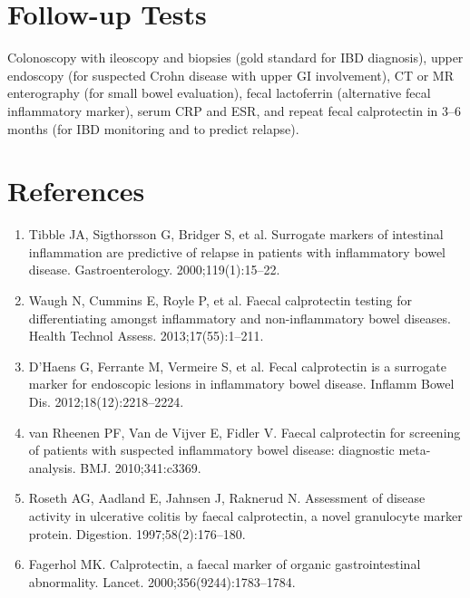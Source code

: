 \section*{Follow-up Tests}
Colonoscopy with ileoscopy and biopsies (gold standard for IBD diagnosis), upper endoscopy (for suspected Crohn disease with upper GI involvement), CT or MR enterography (for small bowel evaluation), fecal lactoferrin (alternative fecal inflammatory marker), serum CRP and ESR, and repeat fecal calprotectin in 3--6 months (for IBD monitoring and to predict relapse).
\section*{References}
\begin{enumerate}
  \item Tibble JA, Sigthorsson G, Bridger S, et al. Surrogate markers of intestinal inflammation are predictive of relapse in patients with inflammatory bowel disease. Gastroenterology. 2000;119(1):15--22.
  \item Waugh N, Cummins E, Royle P, et al. Faecal calprotectin testing for differentiating amongst inflammatory and non-inflammatory bowel diseases. Health Technol Assess. 2013;17(55):1--211.
  \item D'Haens G, Ferrante M, Vermeire S, et al. Fecal calprotectin is a surrogate marker for endoscopic lesions in inflammatory bowel disease. Inflamm Bowel Dis. 2012;18(12):2218--2224.
  \item van Rheenen PF, Van de Vijver E, Fidler V. Faecal calprotectin for screening of patients with suspected inflammatory bowel disease: diagnostic meta-analysis. BMJ. 2010;341:c3369.
  \item Roseth AG, Aadland E, Jahnsen J, Raknerud N. Assessment of disease activity in ulcerative colitis by faecal calprotectin, a novel granulocyte marker protein. Digestion. 1997;58(2):176--180.
  \item Fagerhol MK. Calprotectin, a faecal marker of organic gastrointestinal abnormality. Lancet. 2000;356(9244):1783--1784.
\end{enumerate}
\clearpage

